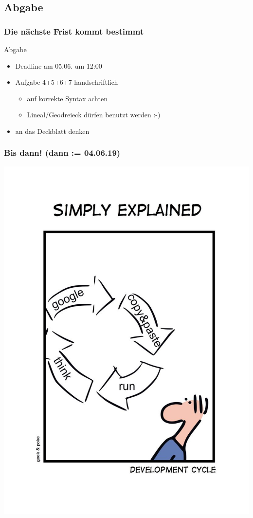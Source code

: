 \documentclass[18pt]{beamer}
\begin{document}
	\subsection{Abgabe}
	\begin{frame}
		\frametitle{Die nächste Frist kommt bestimmt}
		\begin{alertblock}{Abgabe}
			\begin{itemize}
				\item Deadline am 05.06. um 12:00
				\item Aufgabe 4+5+6+7 handschriftlich
				\begin{itemize}
					\item auf korrekte Syntax achten
					\item Lineal/Geodreieck dürfen benutzt werden :-)
				\end{itemize}
				\item an das Deckblatt denken
			\end{itemize}
		\end{alertblock}
	\end{frame}
		
	\begin{frame}
		\frametitle{Bis dann! (dann := 04.06.19)}
		\centering
		\includegraphics[scale=0.9]{./comics/geek_and_poke_development.jpg}
	\end{frame}
\end{document}
